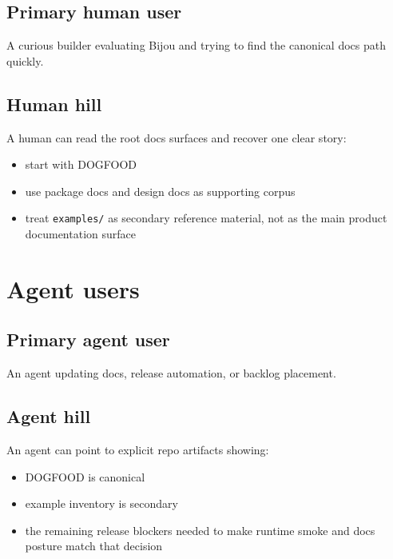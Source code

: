 \subsection{Primary human user}\label{record-086-primary-human-user}

A curious builder evaluating Bijou and trying to find the canonical docs path quickly.

\subsection{Human hill}\label{record-086-human-hill}

A human can read the root docs surfaces and recover one clear story:

\begin{itemize}
\tightlist
\item
  start with DOGFOOD
\item
  use package docs and design docs as supporting corpus
\item
  treat \texttt{e\allowbreak{}x\allowbreak{}a\allowbreak{}m\allowbreak{}p\allowbreak{}l\allowbreak{}e\allowbreak{}s\allowbreak{}/} as secondary reference material, not as the main product documentation surface
\end{itemize}

\section{Agent users}\label{record-086-agent-users}

\subsection{Primary agent user}\label{record-086-primary-agent-user}

An agent updating docs, release automation, or backlog placement.

\subsection{Agent hill}\label{record-086-agent-hill}

An agent can point to explicit repo artifacts showing:

\begin{itemize}
\tightlist
\item
  DOGFOOD is canonical
\item
  example inventory is secondary
\item
  the remaining release blockers needed to make runtime smoke and docs posture match that decision
\end{itemize}

